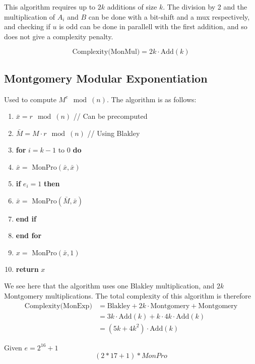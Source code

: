 \documentclass[a4paper,11pt,norsk]{article}
\begin{document}
This algorithm requires up to $2k$ additions of size $k$. The division by 2 and the 
multiplication of $A_i$ and $B$ can be done with a bit-shift and a mux respectively,
and checking if $u$ is odd can be done in parallell with the first addition, and so 
does not give a complexity penalty.

\[
    \text{Complexity(MonMul)} = 2k \cdot \text{Add}(k)
\]

\subsection*{Montgomery Modular Exponentiation}
Used to compute $M^e \mod{(n)}$. The algorithm is as follows:
\begin{enumerate}
    \setlength{\itemsep}{0pt}
    \setlength{\parskip}{0pt}
    \item $\bar{x} = r \mod{(n)}$   \hspace{5cm}// Can be precomputed
    \item $\bar{M} = M \cdot r \mod{(n)}$ \hspace{4.1cm}// Using Blakley

    \item \textbf{for} $i = k-1$ to $0$ \textbf{do}
        \item \hspace{0.75cm} $\bar{x} = \text{ MonPro}(\bar{x}, \bar{x})$
        \item \hspace{0.75cm} \textbf{if} $e_i = 1$ \textbf{then} 
        \item \hspace{1.5cm}  $\bar{x} = \text{ MonPro}(\bar{M}, \bar{x})$
        \item \hspace{0.75cm} \textbf{end if}
    \item \textbf{end for}

    \item $x = \text{ MonPro}(\bar{x}, 1)$
    \item \textbf{return} $x$
\end{enumerate}

We see here that the algorithm uses one Blakley multiplication, and $2k$ Montgomery
multiplications. The total complexity of this algorithm is therefore
\begin{align*}
    \text{Complexity(MonExp)} &= \text{Blakley} + 2k \cdot \text{Montgomery} + \text{Montgomery}\\
                      &= 3k \cdot \text{Add}(k) + k \cdot 4k \cdot \text{Add}(k) \\
                      &= (5k + 4k^2) \cdot \text{Add}(k)
\end{align*}


Given $e = 2^{16} + 1$
\[
    (2 * 17 + 1) * MonPro
\]
\end{document}

